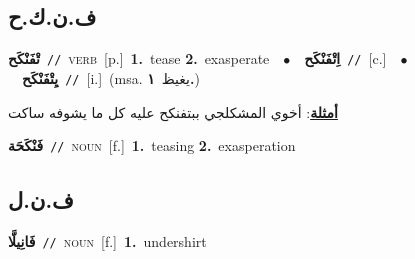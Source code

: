 \documentclass[10pt,a4paper,twoside]{article} %
\begin{document}
\begin{multicols}{2}
\vspace{-3mm}
\subsection*{\color{blue}\foreignlanguage{arabic}{ف.ن.ك.ح}\color{blue}{}} 

{\setlength\topsep{0pt}\textbf{\foreignlanguage{arabic}{تْفَنْكَح}}\ {\color{gray}\texttt{//}\color{black}}\ \textsc{verb}\ [p.]\ \textbf{1.}~tease  \textbf{2.}~exasperate\ \ $\bullet$\ \ \setlength\topsep{0pt}\textbf{\foreignlanguage{arabic}{اِتْفَنْكَح}}\ {\color{gray}\texttt{//}\color{black}}\ [c.]\ \ $\bullet$\ \ \setlength\topsep{0pt}\textbf{\foreignlanguage{arabic}{يِتْفَنْكَح}}\ {\color{gray}\texttt{//}\color{black}}\ [i.]\ \color{gray}(msa. \foreignlanguage{arabic}{يغيظ}~\foreignlanguage{arabic}{\textbf{١.}})\color{black}\  \begin{flushright}\color{gray}\foreignlanguage{arabic}{\textbf{\underline{\foreignlanguage{arabic}{أمثلة}}}: أخوي المشكلجي ببتفنكح عليه كل ما يشوفه ساكت}\end{flushright}\color{black}} \vspace{2mm}

{\setlength\topsep{0pt}\textbf{\foreignlanguage{arabic}{فَنْكَحَة}}\ {\color{gray}\texttt{//}\color{black}}\ \textsc{noun}\ [f.]\ \textbf{1.}~teasing  \textbf{2.}~exasperation\ } \vspace{2mm}

\vspace{-3mm}
\subsection*{\color{blue}\foreignlanguage{arabic}{ف.ن.ل}\color{blue}{ (ntws)}} 

{\setlength\topsep{0pt}\textbf{\foreignlanguage{arabic}{فَانِيلَّا}}\ {\color{gray}\texttt{//}\color{black}}\ \textsc{noun}\ [f.]\ \textbf{1.}~undershirt\ } \vspace{2mm}


\end{multicols}
\end{document}
